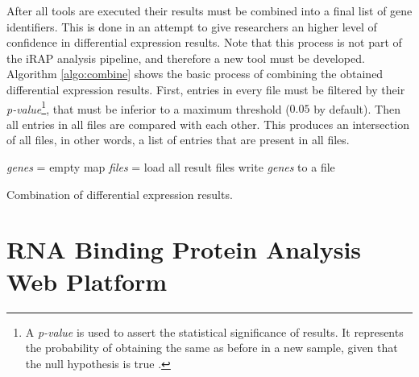 After all tools are executed their results must be combined into a final list of
gene identifiers. This is done in an attempt to give researchers an higher level
of confidence in differential expression results. Note that this process is not
part of the iRAP analysis pipeline, and therefore a new tool must be developed.
Algorithm \ref{algo:combine} shows the basic process of combining the obtained
differential expression results. First, entries in every file must be filtered
by their \emph{p-value}\footnote{A \emph{p-value} is used to assert the
statistical significance of results. It represents the probability of obtaining
the same as before in a new sample, given that the null hypothesis is true
\cite{goodman45dirty}.}, that must be inferior to a maximum threshold ($0.05$ by
default). Then all entries in all files are compared with each other. This
produces an intersection of all files, in other words, a list of entries that
are present in all files.

\begin{algorithm}
  \emph{genes} = empty map\;
  \emph{files} = load all result files\;
  write \emph{genes} to a file\;
  \BlankLine

  \caption[Combination of differential expression results]{
    Combination of differential expression results.
  }
  \label{algo:combine}
\end{algorithm}

\section{RNA Binding Protein Analysis Web Platform}


